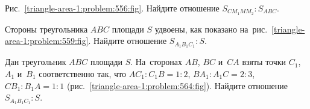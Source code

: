 \begin{problems}
\item
\label{triangle-area-1:problem:556}%
Рис.~\ref{triangle-area-1:problem:556:fig}.
Найдите отношение $S_{C M_1 M M_2} : S_{ABC}$.

\item
\label{triangle-area-1:problem:559}%
Стороны треугольника $ABC$ площади $S$ удвоены, как показано
на~рис.~\ref{triangle-area-1:problem:559:fig}.
Найдите отношение $S_{A_1 B_1 C_1} : S$.

\item
\label{triangle-area-1:problem:564}%
Дан треугольник $ABC$ площади $S$.
На~сторонах $AB$, $BC$ и~$CA$ взяты точки $C_1$, $A_1$ и~$B_1$ соответственно
так, что
$A C_1 : C_1 B = 1 : 2$, $B A_1 : A_1 C = 2 : 3$, $C B_1 : B_1 A = 1 : 1$
(рис.~\ref{triangle-area-1:problem:564:fig}).
Найдите отношение $S_{A_1 B_1 C_1} : S$.

\end{problems}

